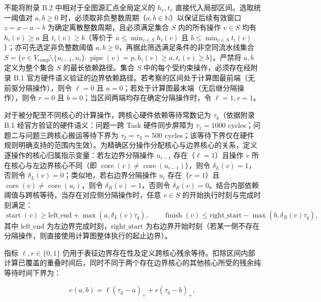 \documentclass[anonymous,withtoc]{gmcm2026}
\begin{document}
不能将附录 B.2 中相对于全图源汇点全局定义的 \(h_v, t_v\) 直接代入局部区间。选取统一阈值对 \(a, b \ge 0\) 时，必须取非负整数周期（\(a, b \in \mathbb{N}\)）以保证后续有效窗口 \(z = x - a - b\) 为确定离散整数周期，且必须满足集合 \(S\) 内的所有操作 \(v \in S\) 均有 \(h_i(v) \ge a\) 且 \(t_i(v) \ge b\)（等价于 \(a \le \min_{v \in S} h_i(v)\) 且 \(b \le \min_{v \in S} t_i(v)\)）；亦可先选定非负整数阈值 \(a, b \ge 0\)，再据此筛选满足条件的非空同流水线集合 \(S = \{v \in V_{\mathrm{comp}} \setminus \{u_{i-1}, u_i\} : \operatorname{pipe}(v) = p, h_i(v) \ge a, t_i(v) \ge b\}\)。严禁将 \(a, b\) 定义为整个集合 \(S\) 的最长依赖路径。集合 \(S\) 中的每个受约束操作，必须存在经附录 B.1 官方硬件语义验证的边界依赖路径。若考察的区间处于计算图最前端（无前驱分隔操作），则令 \(\ell = 0\) 且 \(a = 0\)；若处于计算图最末端（无后继分隔操作），则令 \(r = 0\) 且 \(b = 0\)；当区间两端均存在确定分隔操作时，令 \(\ell = 1, r = 1\)。

对于被分配至不同核心的计算操作，跨核心硬件依赖等待常数记为 \(\tau_q\)（依据附录 B.1 经官方验证的硬件语义：问题一跨 Task 硬件同步屏障为 \(\tau_1 = 1000\) cycles；问题二与问题三跨核心搬运等待下界为 \(\tau_2 = \tau_3 = 500\) cycles；该等待下界仅在硬件规则明确支持的范围内生效）。为精确区分操作分配核心与边界核心的关系，定义逐操作的核心归属指示变量：若左边界分隔操作 \(u_{i-1}\) 存在（\(\ell = 1\)）且操作 \(v\) 所在核心与左边界核心不同（即 \(\operatorname{core}(v) \ne \operatorname{core}(u_{i-1})\)），则令 \(\delta_L(v) = 1\)，否则令 \(\delta_L(v) = 0\)；类似地，若右边界分隔操作 \(u_i\) 存在（\(r = 1\)）且 \(\operatorname{core}(v) \ne \operatorname{core}(u_i)\)，则令 \(\delta_R(v) = 1\)，否则令 \(\delta_R(v) = 0\)。结合内部依赖阈值与跨核等待，当存在对应侧分隔操作时，任意 \(v \in S\) 的开始执行时刻与完成时刻满足： \begin{equation}
\operatorname{start}(v) \ge \text{left\_end} + \max(a, \delta_L(v) \tau_q), \qquad \operatorname{finish}(v) \le \text{right\_start} - \max(b, \delta_R(v) \tau_q),
\end{equation} 其中 \(\text{left\_end}\) 为左边界完成时刻，\(\text{right\_start}\) 为右边界开始时刻（若某一侧不存在分隔操作，则直接使用计算图整体执行的起止边界）。

指标 \(\ell, r \in \{0, 1\}\) 仍用于表征边界存在性及定义跨核心残余等待。扣除区间内部计算已覆盖的重叠时间后，同时不同于两个存在边界核心的其他核心所受的残余纯等待时间下界为：

\begin{equation}
c(a,b) = \ell(\tau_q - a)_+ + r(\tau_q - b)_+,
\end{equation}
\end{document}
